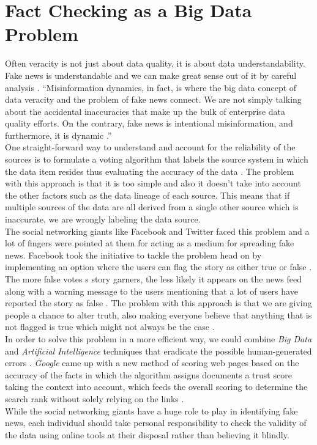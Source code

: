 \documentclass[sigconf]{acmart}
\begin{document}
\section{Fact Checking as a Big Data Problem}
Often veracity is not just about data quality, it is about data understandability. Fake news is understandable and we can make great sense out of it by careful analysis \cite{www-forbes2}. ``Misinformation dynamics, in fact, is where the big data concept of data veracity and the problem of fake news connect. We are not simply talking about the accidental inaccuracies that make up the bulk of enterprise data quality efforts. On the contrary, fake news is intentional misinformation, and furthermore, it is dynamic \cite{www-forbes2}.''  \\
One straight-forward way to understand and account for the reliability of the sources is to formulate a voting algorithm that labels the source system in which the data item resides thus evaluating the accuracy of the data \cite{www-forbes1}. The problem with this approach is that it is too simple and also it doesn't take into account the other factors such as the data lineage of each source. This means that if multiple sources of the data are all derived from a single other source which is inaccurate, we are wrongly labeling the data source. \\ 
The social networking giants like Facebook and Twitter faced this problem and a lot of fingers were pointed at them for acting as a medium for spreading fake news. Facebook took the initiative to tackle the problem head on by implementing an option where the users can flag the story as either true or false \cite{www-forbes2}. The more false votes s story garners, the less likely it appears on the news feed along with a warning message to the users mentioning that a lot of users have reported the story as false \cite{www-forbes2}. The problem with this approach is that we are giving people a chance to alter truth, also making everyone believe that anything that is not flagged is true which might not always be the case \cite{www-forbes2} . \\ 
In order to solve this problem in a more efficient way, we could combine {\em Big Data} and {\em Artificial Intelligence} techniques that eradicate the possible human-generated errors \cite{www-forbes2}. {\em Google} came up with a new method of scoring web pages based on the accuracy of the facts in which the algorithm assigns documents a trust score taking the context into account, which feeds the overall scoring to determine the search rank without solely relying on the links \cite{www-forbes2}. \\
While the social networking giants have a huge role to play in identifying fake news, each individual should take personal responsibility to check the validity of the data using online tools at their disposal rather than believing it blindly. 
\end{document}
